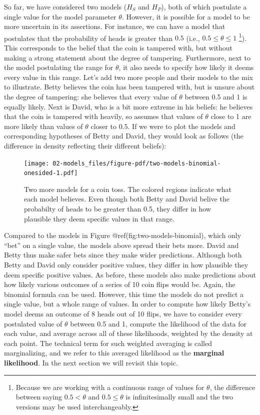 \documentclass[
  letterpaper,
  DIV=11,
  numbers=noendperiod]{scrreprt}
\begin{document}
So far, we have considered two models (\(H_S\) and \(H_P\)), both of
which postulate a single value for the model parameter \(\theta\).
However, it is possible for a model to be more uncertain in its
assertions. For instance, we can have a model that postulates that the
probability of heads is greater than \(0.5\) (i.e.,
\(0.5 \leq \theta \leq 1\) \footnote{Because we are working with a
  continuous range of values for \(\theta\), the difference between
  saying \(0.5 < \theta\) and \(0.5 \leq \theta\) is infinitesimally
  small and the two versions may be used interchangeably.}). This
corresponds to the belief that the coin is tampered with, but without
making a strong statement about the degree of tampering. Furthermore,
next to the model postulating the range for \(\theta\), it also needs to
specify how likely it deems every value in this range. Let's add two
more people and their models to the mix to illustrate. Betty believes
the coin has been tampered with, but is unsure about the degree of
tampering: she believes that every value of \(\theta\) between 0.5 and 1
is equally likely. Next is David, who is a bit more extreme in his
beliefs: he believes that the coin is tampered with heavily, so assumes
that values of \(\theta\) close to 1 are more likely than values of
\(\theta\) closer to \(0.5\). If we were to plot the models and
corresponding hypotheses of Betty and David, they would look as follows
(the difference in density reflecting their different beliefs):

\begin{figure}

{\centering \texttt{[image: 02-models\_files/figure-pdf/two-models-binomial-onesided-1.pdf]}

}

\caption{Two more models for a coin toss. The colored regions indicate
what each model believes. Even though both Betty and David belive the
probabilty of heads to be greater than 0.5, they differ in how plausible
they deem specific values in that range.}

\end{figure}

Compared to the models in Figure @ref(fig:two-models-binomial), which
only ``bet'' on a single value, the models above spread their bets more.
David and Betty thus make safer bets since they make wider predictions.
Although both Betty and David only consider positive values, they differ
in how plausible they deem specific positive values. As before, these
models also make predictions about how likely various outcomes of a
series of 10 coin flips would be. Again, the binomial formula can be
used. However, this time the models do not predict a single value, but a
whole range of values. In order to compute how likely Betty's model
deems an outcome of 8 heads out of 10 flips, we have to consider every
postulated value of \(\theta\) between 0.5 and 1, compute the likelihood
of the data for each value, and average across all of these likelihoods,
weighted by the density at each point. The technical term for such
weighted averaging is called marginalizing, and we refer to this
averaged likelihood as the \textbf{marginal likelihood}. In the next
section we will revisit this topic.
\end{document}
